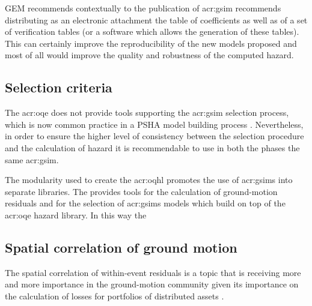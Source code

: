GEM recommends contextually to the publication of \gls{acr:gsim} recommends
distributing as an electronic attachment the table of coefficients as well 
as of a set of verification tables (or a software which allows the generation 
of these tables). This can certainly improve the reproducibility of the 
new models proposed and most of all would improve the quality and 
robustness of the computed hazard.
%
\subsection{Selection criteria}
The \gls{acr:oqe} does not provide tools supporting the \gls{acr:gsim}
selection process, which is now common practice in a PSHA model building 
process \parencite[see for example][]{delavaud2012}. Nevertheless, in order 
to ensure the higher level of consistency between the selection procedure and
the calculation of hazard it is recommendable to use in both the phases the 
same \gls{acr:gsim}. 

The modularity used to create the {acr:oqhl} promotes the use of 
\glspl{acr:gsim} into separate libraries. The %
\parencite{weatherill2014} provides tools for the calculation of ground-motion
residuals and for the selection of \glspl{acr:gsim} models which build on top 
of the \gls{acr:oqe} hazard library. In this way the 
%
\subsection{Spatial correlation of ground motion}
The spatial correlation of within-event residuals is a topic that is 
receiving more and more importance in the ground-motion community given 
its importance on the calculation of losses for portfolios of distributed 
assets \parencite{crowley2006}.
